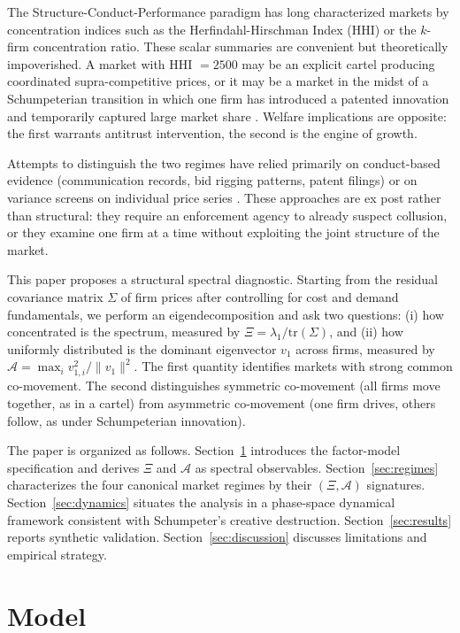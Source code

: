 \documentclass[12pt,a4paper]{article}
\newcommand{\SEA}{\mathcal{A}}
\begin{document}
The Structure-Conduct-Performance paradigm \cite{mason1939,bain1956} has long characterized markets by concentration indices such as the Herfindahl-Hirschman Index (HHI) or the $k$-firm concentration ratio. These scalar summaries are convenient but theoretically impoverished. A market with HHI $= 2500$ may be an explicit cartel producing coordinated supra-competitive prices, or it may be a market in the midst of a Schumpeterian transition in which one firm has introduced a patented innovation and temporarily captured large market share \cite{schumpeter1942}. Welfare implications are opposite: the first warrants antitrust intervention, the second is the engine of growth.

Attempts to distinguish the two regimes have relied primarily on conduct-based evidence (communication records, bid rigging patterns, patent filings) or on variance screens on individual price series \cite{abrantes2006,harrington2008}. These approaches are ex post rather than structural: they require an enforcement agency to already suspect collusion, or they examine one firm at a time without exploiting the joint structure of the market.

This paper proposes a structural spectral diagnostic. Starting from the residual covariance matrix $\Sigma$ of firm prices after controlling for cost and demand fundamentals, we perform an eigendecomposition and ask two questions: (i) how concentrated is the spectrum, measured by $\Xi = \lambda_1 / \mathrm{tr}(\Sigma)$, and (ii) how uniformly distributed is the dominant eigenvector $v_1$ across firms, measured by $\SEA = \max_i v_{1,i}^2 / \|v_1\|^2$. The first quantity identifies markets with strong common co-movement. The second distinguishes symmetric co-movement (all firms move together, as in a cartel) from asymmetric co-movement (one firm drives, others follow, as under Schumpeterian innovation).

The paper is organized as follows. Section~\ref{sec:model} introduces the factor-model specification and derives $\Xi$ and $\SEA$ as spectral observables. Section~\ref{sec:regimes} characterizes the four canonical market regimes by their $(\Xi, \SEA)$ signatures. Section~\ref{sec:dynamics} situates the analysis in a phase-space dynamical framework consistent with Schumpeter's creative destruction. Section~\ref{sec:results} reports synthetic validation. Section~\ref{sec:discussion} discusses limitations and empirical strategy.

\section{Model}
\label{sec:model}
\end{document}
